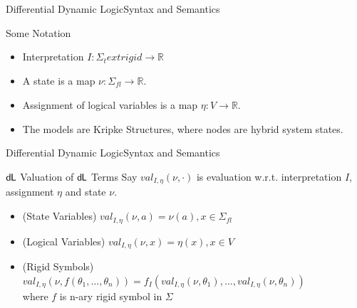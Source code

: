 \documentclass{beamer}
\newcommand{\dL}{\text{\upshape\textsf{d{\kern-0.05em}L}}}
\newcommand{\R}{\mathbb{R}}
\newcommand{\val}[4]{\textit{val}_{#1, #2}(#3, #4)}
\newcommand{\valDefault}[1]{\val{I}{\eta}{\nu}{#1}}
\begin{document}
\begin{frame}{Differential Dynamic Logic}{Syntax and Semantics}
  \begin{block}{Some Notation}
    \begin{itemize}
      \item Interpretation $I: \Sigma_text{rigid} \to \mathbb{R}$
      \item A state is a map $\nu : \Sigma_{\textit{fl}} \to \R$.
      \item Assignment of logical variables is a map $\eta : V \to \R$.
      \item The models are Kripke Structures, where nodes are
        hybrid system states.
    \end{itemize}
  \end{block}
\end{frame}

\begin{frame}{Differential Dynamic Logic}{Syntax and Semantics}
    \begin{block}{$\dL$ Valuation of $\dL$ Terms}
      Say $\valDefault{\cdot}$ is evaluation w.r.t. interpretation $I$, assignment $\eta$ and state $\nu$.
      \pause
      \begin{itemize}
      \item (State Variables) $\valDefault{a} = \nu(a), x \in \Sigma_{\textit{fl}}$
        \pause
      \item (Logical Variables) $\valDefault{x} = \eta(x), x \in V$
        \pause
      \item (Rigid Symbols) $\valDefault{f(\theta_1, \ldots, \theta_n)} =
          f_I(\valDefault{\theta_1}, \ldots, \valDefault{\theta_n})$ \\
          where $f$ is n-ary rigid symbol in $\Sigma$
      \end{itemize}
    \end{block}
\end{frame}
\end{document}
